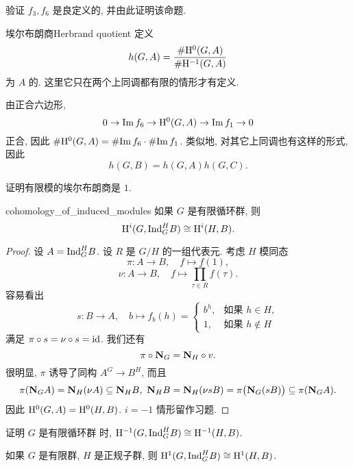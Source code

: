 \begin{exercise}
验证 $f_3,f_6$ 是良定义的, 并由此证明该命题.
\end{exercise}

\begin{definition}{埃尔布朗商}{Herbrand quotient}
定义 
  \[h(G,A)=\frac{\#{\mathrm{H}}^0(G,A)}{\#{\mathrm{H}}^{-1}(G,A)}\]
为 $A$ 的. 这里它只在两个上同调都有限的情形才有定义.
\end{definition}

由正合六边形,
  \[0\rightarrow {\mathrm{Im}\,} f_6\to {\mathrm{H}}^0(G,A)\rightarrow {\mathrm{Im}\,} f_1\rightarrow 0\]
正合, 因此 $\#{\mathrm{H}}^0(G,A)=\#{\mathrm{Im}\,} f_6\cdot\#{\mathrm{Im}\,} f_1$. 类似地, 对其它上同调也有这样的形式, 因此
  \[h(G,B)=h(G,A)h(G,C).\]

\begin{exercise}
证明有限模的埃尔布朗商是 $1$.
\end{exercise}

\begin{proposition}{}{cohomology_of_induced_modules}
如果 $G$ 是有限循环群, 则
  \[{\mathrm{H}}^i(G,{\mathrm{Ind}}^H_GB)\cong {\mathrm{H}}^i(H,B).\]
\end{proposition}
\begin{proof}
设 $A={\mathrm{Ind}}_G^H B$. 设 $R$ 是 $G/H$ 的一组代表元. 考虑 $H$ 模同态
  \[\pi:A\to B,\quad f\mapsto f(1),\]
  \[\nu:A\to B,\quad f\mapsto \prod_{\tau\in R}f(\tau).\]
容易看出
  \[s:B\to A,\quad b\mapsto f_b(h)=\begin{cases}
    b^h, &\text{如果 }h\in H,\\
    1,   &\text{如果 }h\notin H
  \end{cases}\]
满足 $\pi\circ s=\nu\circ s={\mathrm{id}}$. 我们还有
  \[\pi\circ {\mathbf{N}}_G={\mathbf{N}}_H\circ v.\]
很明显, $\pi$ 诱导了同构 $A^G\to B^H$, 而且 
	\[\pi(\bfN_GA)=\bfN_H(\nu A)\subseteq \bfN_HB,\ 
	\bfN_H B=\bfN_H(\nu s B)=\pi\bigl(\bfN_G(sB)\bigr)\subseteq \pi(\bfN_G A).\]
因此 ${\mathrm{H}}^0(G,A)={\mathrm{H}}^0(H,B)$. $i=-1$ 情形留作习题.
\end{proof}

\begin{exercise}
证明 $G$ 是有限循环群 时, ${\mathrm{H}}^{-1}(G,{\mathrm{Ind}}^H_GB)\cong {\mathrm{H}}^{-1}(H,B)$.
\end{exercise}

\begin{exercise}
如果 $G$ 是有限群, $H$ 是正规子群, 则 ${\mathrm{H}}^1(G,{\mathrm{Ind}}^H_GB)\cong {\mathrm{H}}^1(H,B)$.
\end{exercise}




